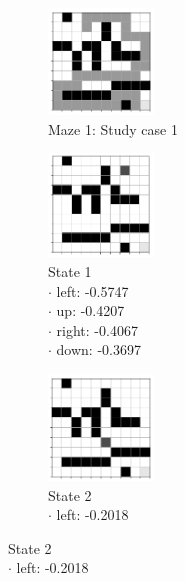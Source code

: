 \documentclass[a4paper]{article}    %
\begin{document}
\begin{figure}[H]
    \centering
    \begin{subfigure}{0.24\textwidth}
        \centering
        \includegraphics[width=2.8cm]{maze2-case1}
        \caption{Maze 1: Study case 1 \vspace{12mm}}
        \label{fig:maze2-case1-states}
    \end{subfigure}
    \hfill
    \centering
    \begin{subfigure}{0.24\textwidth}
        \centering
        \includegraphics[width=2.8cm]{maze2-case1-state1}
        \caption{State 1 \\
            \scriptsize
            \hspace*{5mm} $\boldsymbol{\cdot}$ left:  -0.5747 \\
            \hspace*{5mm} $\boldsymbol{\cdot}$ up:    -0.4207 \\
            \hspace*{5mm} $\boldsymbol{\cdot}$ right: -0.4067 \\
            \hspace*{5mm} $\boldsymbol{\cdot}$ down:  -0.3697 }
        \label{fig:maze2-case1-state1}
    \end{subfigure}
    \hfill
    \begin{subfigure}{0.24\textwidth}
        \centering
        \includegraphics[width=2.8cm]{maze2-case1-state2}
        \caption{State 2 \\
            \scriptsize
            \hspace*{5mm} $\boldsymbol{\cdot}$ left:  -0.2018 \\
}
\end{subfigure}
\end{figure}
\end{document}
